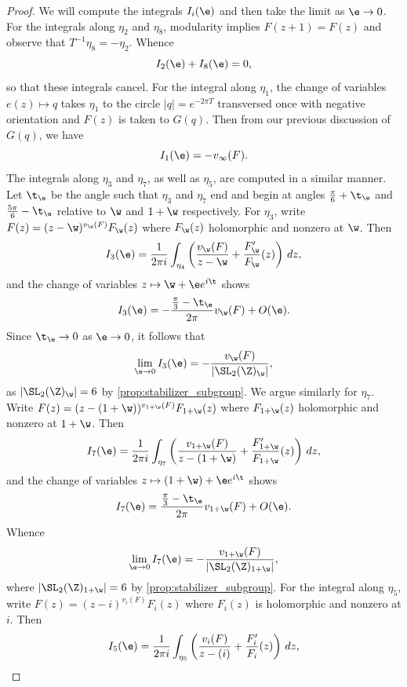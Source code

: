 \documentclass[12pt]{article}
\begin{document}
\begin{proof}
        \noindent We will compute the integrals \(I_{i}(\e)\) and then take the limit as \(\e \to 0\). For the integrals along \(\eta_{2}\) and \(\eta_{8}\), modularity implies \(F(z+1) = F(z)\) and observe that \(T^{-1}\eta_{8} = -\eta_{2}\). Whence
        \[
          I_{2}(\e)+I_{8}(\e) = 0,
        \]
        so that these integrals cancel. For the integral along \(\eta_{1}\), the change of variables \(e(z) \mapsto q\) takes \(\eta_{1}\) to the circle \(|q| = e^{-2\pi T}\) transversed once with negative orientation and \(F(z)\) is taken to \(G(q)\). Then from our previous discussion of \(G(q)\), we have
        \[
          I_{1}(\e) = -v_{\infty}(F).
        \]
        The integrals along \(\eta_{3}\) and \(\eta_{7}\), as well as \(\eta_{5}\), are computed in a similar manner. Let \(\t_{\e}\) be the angle such that \(\eta_{3}\) and \(\eta_{7}\) end and begin at angles \(\frac{\pi}{6}+\t_{\e}\) and \(\frac{5\pi}{6}-\t_{\e}\) relative to \(\w\) and \(1+\w\) respectively. For \(\eta_{3}\), write \(F(z) = (z-\w)^{v_{\w}(F)}F_{\w}(z)\) where \(F_{\w}(z)\) holomorphic and nonzero at \(\w\). Then 
        \[
          I_{3}(\e) = \frac{1}{2\pi i}\int_{\eta_{4}}\left(\frac{v_{\w}(F)}{z-\w}+\frac{F_{\w}'}{F_{\w}}(z)\right)\,dz,
        \]
        and the change of variables \(z \mapsto \w+\e e^{i\t}\) shows
        \[
          I_{3}(\e) = -\frac{\frac{\pi}{3}-\t_{\e}}{2\pi}v_{\w}(F)+O(\e).
        \]
        Since \(\t_{\e} \to 0\) as \(\e \to 0\), it follows that
        \[
          \lim_{\e \to 0}I_{3}(\e) = -\frac{v_{\w}(F)}{|\SL_{2}(\Z)_{\w}|},
        \]
        as \(|\SL_{2}(\Z)_{\w}| = 6\) by \cref{prop:stabilizer_subgroup}. We argue similarly for \(\eta_{7}\). Write \(F(z) = (z-(1+\w))^{v_{1+\w}(F)}F_{1+\w}(z)\) where \(F_{1+\w}(z)\) holomorphic and nonzero at \(1+\w\). Then
        \[
          I_{7}(\e) = \frac{1}{2\pi i}\int_{\eta_{7}}\left(\frac{v_{1+\w}(F)}{z-(1+\w)}+\frac{F_{1+\w}'}{F_{1+\w}}(z)\right)\,dz,
        \]
        and the change of variables \(z \mapsto (1+\w)+\e e^{i\t}\) shows
        \[
          I_{7}(\e) = \frac{\frac{\pi}{3}-\t_{\e}}{2\pi}v_{1+\w}(F)+O(\e).
        \]
        Whence
        \[
          \lim_{\e \to 0}I_{7}(\e) = -\frac{v_{1+\w}(F)}{|\SL_{2}(\Z)_{1+\w}|},
        \]
        where \(|\SL_{2}(\Z)_{1+\w}| = 6\) by \cref{prop:stabilizer_subgroup}. For the integral along \(\eta_{5}\), write \(F(z) = (z-i)^{v_{i}(F)}F_{i}(z)\) where \(F_{i}(z)\) is holomorphic and nonzero at \(i\). Then
        \[
          I_{5}(\e) = \frac{1}{2\pi i}\int_{\eta_{5}}\left(\frac{v_{i}(F)}{z-(i)}+\frac{F_{i}'}{F_{i}}(z)\right)\,dz,
\]
\end{proof}
\end{document}
